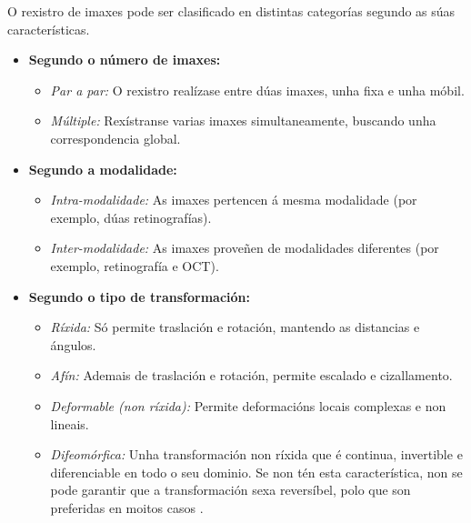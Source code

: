 O rexistro de imaxes pode ser clasificado en distintas categorías segundo as súas características.

\begin{itemize}
    \item \textbf{Segundo o número de imaxes:}
    \begin{itemize}
        \item \textit{Par a par:} O rexistro realízase entre dúas imaxes, unha fixa e unha móbil.
        \item \textit{Múltiple:} Rexístranse varias imaxes simultaneamente, buscando unha correspondencia global.
    \end{itemize}

    \item \textbf{Segundo a modalidade:}
    \begin{itemize}
        \item \textit{Intra-modalidade:} As imaxes pertencen á mesma modalidade (por exemplo, dúas retinografías).
        \item \textit{Inter-modalidade:} As imaxes proveñen de modalidades diferentes (por exemplo, retinografía e OCT).
    \end{itemize}

    \item \textbf{Segundo o tipo de transformación:}
    \begin{itemize}
        \item \textit{Ríxida:} Só permite traslación e rotación, mantendo as distancias e ángulos.
        \item \textit{Afín:} Ademais de traslación e rotación, permite escalado e cizallamento.
        \item \textit{Deformable (non ríxida):} Permite deformacións locais complexas e non lineais.
        \item \textit{Difeomórfica:} Unha transformación non ríxida que é continua, invertible e diferenciable en todo o seu dominio. Se non tén esta característica, non se pode garantir que a transformación sexa reversíbel, polo que son preferidas en moitos casos \cite{han2022diffeomorphicimageregistrationneural}.
    \end{itemize}


\end{itemize}
